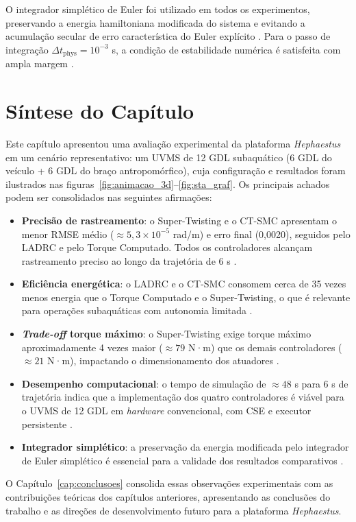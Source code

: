 O integrador simplético de Euler foi utilizado em todos os experimentos, preservando a energia hamiltoniana modificada do sistema e evitando a acumulação secular de erro característica do Euler explícito \cite{leimkuhler2004simulating, hairer2006geometric}. Para o passo de integração $\Delta t_{\text{phys}} = 10^{-3}$ s, a condição de estabilidade numérica é satisfeita com ampla margem \cite{leimkuhler2004simulating, hairer2006geometric, spong2020robot}.

\section{Síntese do Capítulo}

Este capítulo apresentou uma avaliação experimental da plataforma \textit{Hephaestus} em um cenário representativo: um UVMS de 12 GDL subaquático (6 GDL do veículo + 6 GDL do braço antropomórfico), cuja configuração e resultados foram ilustrados nas figuras~\ref{fig:animacao_3d}--\ref{fig:sta_graf}. Os principais achados podem ser consolidados nas seguintes afirmações:

\begin{itemize}
    \item \textbf{Precisão de rastreamento}: o Super-Twisting e o CT-SMC apresentam o menor RMSE médio ($\approx 5{,}3\times10^{-5}$ rad/m) e erro final (0,0020), seguidos pelo LADRC e pelo Torque Computado. Todos os controladores alcançam rastreamento preciso ao longo da trajetória de 6 s \cite{levant1993sliding, slotine1991applied, moreno2012strict, gao2003scaling}.

    \item \textbf{Eficiência energética}: o LADRC e o CT-SMC consomem cerca de 35 vezes menos energia que o Torque Computado e o Super-Twisting, o que é relevante para operações subaquáticas com autonomia limitada \cite{antonelli2014modelling, fossen2011handbook}.

    \item \textbf{\textit{Trade-off} torque máximo}: o Super-Twisting exige torque máximo aproximadamente 4 vezes maior ($\approx 79$ N·m) que os demais controladores ($\approx 21$ N·m), impactando o dimensionamento dos atuadores \cite{levant1993sliding, shtessel2014sliding, utkin2017sliding}.

    \item \textbf{Desempenho computacional}: o tempo de simulação de $\approx 48$ s para 6 s de trajetória indica que a implementação dos quatro controladores é viável para o UVMS de 12 GDL em \textit{hardware} convencional, com CSE e executor persistente \cite{meurer2017sympy, leu1986automated, beazley2010understanding}.

    \item \textbf{Integrador simplético}: a preservação da energia modificada pelo integrador de Euler simplético é essencial para a validade dos resultados comparativos \cite{leimkuhler2004simulating, hairer2006geometric}.
\end{itemize}

O Capítulo~\ref{cap:conclusoes} consolida essas observações experimentais com as contribuições teóricas dos capítulos anteriores, apresentando as conclusões do trabalho e as direções de desenvolvimento futuro para a plataforma \textit{Hephaestus}.
